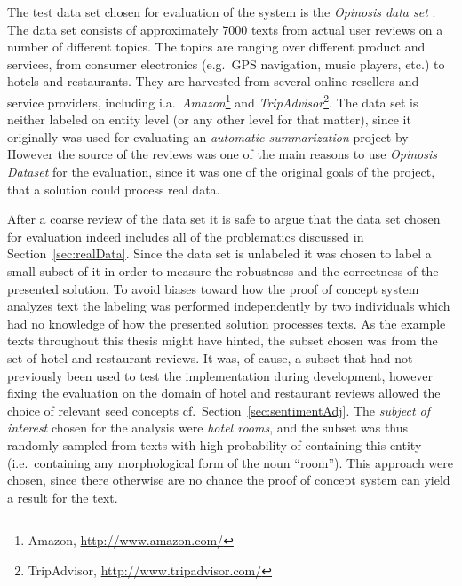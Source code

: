 The test data set chosen for evaluation of the system is the \emph{Opinosis data set} \cite{Opinosis}. The data set consists of  approximately $\num{7000}$ texts from actual user reviews on a number of different topics. The topics are ranging over different product and services, from consumer electronics (e.g.\ GPS navigation, music players, etc.) to hotels and restaurants. They are harvested from several online resellers and service providers, including i.a.\ \emph{Amazon}\footnote{Amazon, \url{http://www.amazon.com/}} and \emph{TripAdvisor}\footnote{TripAdvisor, \url{http://www.tripadvisor.com/}}. The data set is neither labeled on entity level (or any other level for that matter), since it originally was used for evaluating an \emph{automatic summarization} project by \citeauthor{Opinosis} However the source of the reviews was one of the main reasons to use \emph{Opinosis Dataset} for the evaluation, since it was one of the original goals of the project, that a solution could process real data. %

After a coarse review of the data set it is safe to argue that the data set chosen for evaluation indeed includes all of the problematics discussed in Section~\vref{sec:realData}. Since the data set is unlabeled it was chosen to label a small subset of it in order to measure the robustness and the correctness of the presented solution. To avoid biases toward how the proof of concept system analyzes text the labeling was performed independently by two individuals which had no knowledge of how the presented solution processes texts. As the example texts throughout this thesis might have hinted, the subset chosen was from the set of hotel and restaurant reviews. It was, of cause, a subset that had not previously been used to test the implementation during development, however fixing the evaluation on the domain of hotel and restaurant reviews allowed the choice of relevant seed concepts cf.\ Section~\ref{sec:sentimentAdj}. The \emph{subject of interest} chosen for the analysis were \emph{hotel rooms}, and the subset was thus randomly sampled from texts with high probability of containing this entity (i.e.\ containing any morphological form of the noun ``room''). This approach were chosen, since there otherwise are no chance the proof of concept system can yield a result for the text.


